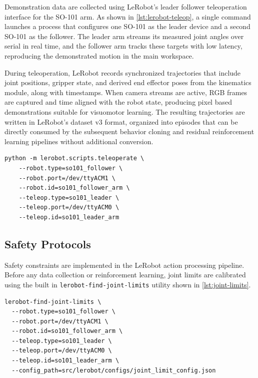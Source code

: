 Demonstration data are collected using LeRobot's leader follower teleoperation interface for the SO-101 arm. As shown in \cref{lst:lerobot-teleop}, a single command launches a process that configures one SO-101 as the leader device and a second SO-101 as the follower. The leader arm streams its measured joint angles over serial in real time, and the follower arm tracks these targets with low latency, reproducing the demonstrated motion in the main workspace.

During teleoperation, LeRobot records synchronized trajectories that include joint positions, gripper state, and derived end effector poses from the kinematics module, along with timestamps. When camera streams are active, RGB frames are captured and time aligned with the robot state, producing pixel based demonstrations suitable for visuomotor learning. The resulting trajectories are written in LeRobot's dataset v3 format, organized into episodes that can be directly consumed by the subsequent behavior cloning and residual reinforcement learning pipelines without additional conversion.

\begin{lstlisting}[float=ht,frame=tb,
caption={Command used to launch the SO101 leader follower teleoperation pair for data collection. The follower arm receives low latency joint targets from the leader device over serial, enabling real world demonstration recording.}, 
label=lst:lerobot-teleop]
python -m lerobot.scripts.teleoperate \
    --robot.type=so101_follower \
    --robot.port=/dev/ttyACM1 \
    --robot.id=so101_follower_arm \
    --teleop.type=so101_leader \
    --teleop.port=/dev/ttyACM0 \
    --teleop.id=so101_leader_arm
\end{lstlisting}

\subsection{Safety Protocols}

Safety constraints are implemented in the LeRobot action processing pipeline. Before any data collection or reinforcement learning, joint limits are calibrated using the built in \texttt{lerobot-find-joint-limits} utility shown in \cref{lst:joint-limits}. 

\begin{lstlisting}[float=ht,frame=tb,
caption={Command used to identify per-joint limits for the SO101 follower arm. The resulting configuration file is reused at training and deployment time to clip actions to a safe workspace.},
label=lst:joint-limits]
lerobot-find-joint-limits \
  --robot.type=so101_follower \
  --robot.port=/dev/ttyACM1 \
  --robot.id=so101_follower_arm \
  --teleop.type=so101_leader \
  --teleop.port=/dev/ttyACM0 \
  --teleop.id=so101_leader_arm \
  --config_path=src/lerobot/configs/joint_limit_config.json
\end{lstlisting}


